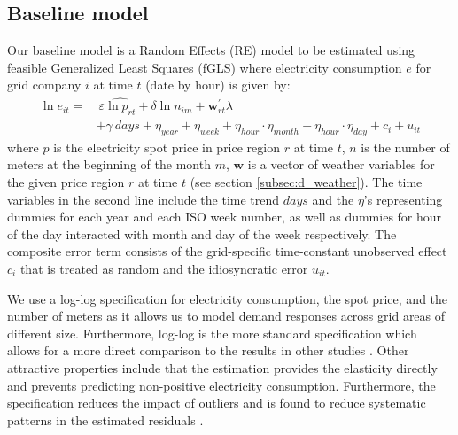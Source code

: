 \label{sec:empirical}
\subsection{Baseline model}
\label{subsec:e_model}
Our baseline model is a Random Effects (RE) model to be estimated using feasible Generalized Least Squares (fGLS) where electricity consumption $e$ for grid company $i$ at time $t$ (date by hour) is given by:
\begin{equation}
  \label{eq:baseline}
  \begin{split}
  \ln e_{it}=&\ \varepsilon \widehat{\ln p_{rt}}+\delta\ln n_{im}+\bm{w}^{'}_{rt}\lambda\\
  &+\gamma\ days+\eta_{year}+\eta_{week}+\eta_{hour}\cdot\eta_{month}+\eta_{hour}\cdot\eta_{day}+c_i+u_{it}
  \end{split}
\end{equation}
where $p$ is the electricity spot price in price region $r$ at time $t$, $n$ is the number of meters at the beginning of the month $m$, $\bm{w}$ is a vector of weather variables for the given price region $r$ at time $t$ (see section \ref{subsec:d_weather}). The time variables in the second line include the time trend $days$ and the $\eta$'s representing dummies for each year and each ISO week number, as well as dummies for hour of the day interacted with month and day of the week respectively. The composite error term consists of the grid-specific time-constant unobserved effect $c_i$ that is treated as random and the idiosyncratic error $u_{it}$.
\bigskip\par
We use a log-log specification for electricity consumption, the spot price, and the number of meters as it allows us to model demand responses across grid areas of different size. Furthermore, log-log is the more standard specification which allows for a more direct comparison to the results in other studies \citep{burke2017price}. Other attractive properties include that the estimation provides the elasticity directly and prevents predicting non-positive electricity consumption. Furthermore, the specification reduces the impact of outliers and is found to reduce systematic patterns in the estimated residuals \citep{burke2017price}.


